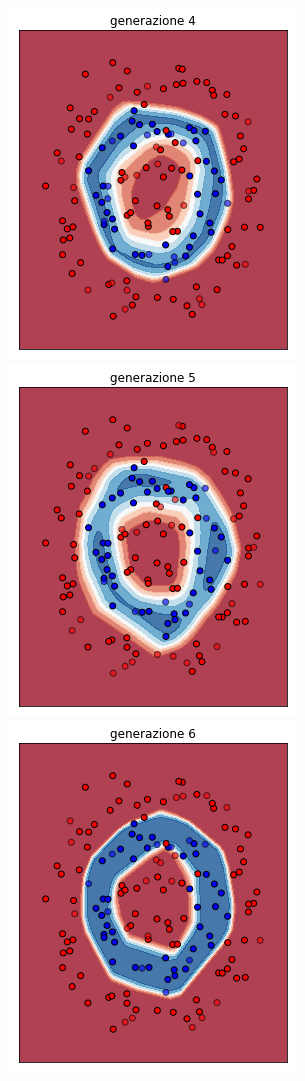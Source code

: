 \documentclass{beamer}
\begin{document}
\begin{frame}
\begin{figure}
  \includegraphics[scale = 0.25]{images/circle+-rnd-log./4.png}
  \includegraphics[scale = 0.25]{images/circle+-rnd-log./5.png}
  \includegraphics[scale = 0.25]{images/circle+-rnd-log./6.png}

\end{figure}
\end{frame}
\end{document}
